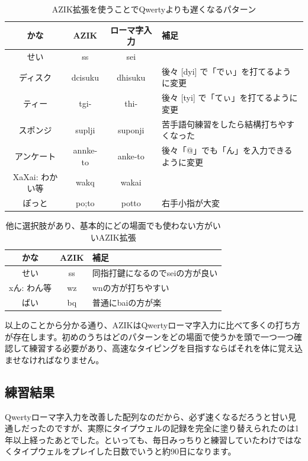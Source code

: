 \begin{table}
\begin{center}
\caption{AZIK拡張を使うことでQwertyよりも遅くなるパターン}
\label{tomoemon:later_azik}
\begin{tabular}{cccl}
\hline
かな & AZIK & ローマ字入力 & 補足 \\
\hline
せい & ss & sei & \\
ディスク & dcisuku & dhisuku & 後々 [dyi] で「でぃ」を打てるように変更 \\
ティー & tgi- & thi- & 後々 [tyi] で「てぃ」を打てるように変更 \\
スポンジ & suplji & suponji & 苦手語句練習をしたら結構打ちやすくなった \\
アンケート & annke-to & anke-to & 後々「@」でも「ん」を入力できるように変更 \\
XaXai: わかい等 & wakq & wakai &  \\
ぽっと & po;to & potto & 右手小指が大変 \\
\hline
\end{tabular}
\end{center}
\end{table}

\begin{table}
\begin{center}
\caption{他に選択肢があり、基本的にどの場面でも使わない方がいいAZIK拡張}
\label{tomoemon:non_azik}
\begin{tabular}{ccl}
\hline
かな & AZIK & 補足 \\
\hline
せい & ss & 同指打鍵になるのでseiの方が良い \\
xん: わん等 & wz & wnの方が打ちやすい \\
ばい & bq & 普通にbaiの方が楽 \\
\hline
\end{tabular}
\end{center}
\end{table}

以上のことから分かる通り、AZIKはQwertyローマ字入力に比べて多くの打ち方が存在します。初めのうちはどのパターンをどの場面で使うかを頭で一つ一つ確認して練習する必要があり、高速なタイピングを目指すならばそれを体に覚え込ませなければなりません。

\subsection{練習結果}

Qwertyローマ字入力を改善した配列なのだから、必ず速くなるだろうと甘い見通しだったのですが、実際にタイプウェルの記録を完全に塗り替えられたのは1年以上経ったあとでした。といっても、毎日みっちりと練習していたわけではなくタイプウェルをプレイした日数でいうと約90日になります。

